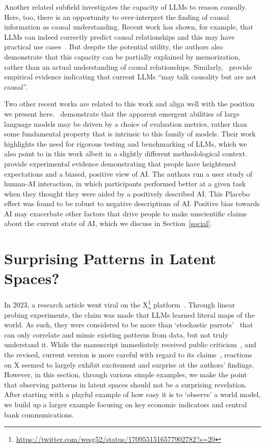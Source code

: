 Another related subfield investigates the capacity of LLMs to reason causally. Here, too, there is an opportunity to over-interpret the finding of causal information as causal understanding. Recent work has shown, for example, that LLMs can indeed correctly predict causal relationships and this may have practical use cases~\citep{kiciman2023causal}. But despite the potential utility, the authors also demonstrate that this capacity can be partially explained by memorization, rather than an actual understanding of causal relationships. Similarly,~\citet{zevcevic2023causal} provide empirical evidence indicating that current LLMs ``may talk causality but are not causal''.

Two other recent works are related to this work and align well with the position we present here.~\citet{schaeffer2024emergent} demonstrate that the apparent emergent abilities of large language models may be driven by a choice of evaluation metrics, rather than some fundamental property that is intrinsic to this family of models. Their work highlights the need for rigorous testing and benchmarking of LLMs, which we also point to in this work albeit in a slightly different methodological context.~\citet{kloft2024ai} provide experimental evidence demonstrating that people have heightened expectations and a biased, positive view of AI. The authors run a user study of human-AI interaction, in which participants performed better at a given task when they thought they were aided by a positively described AI. This Placebo effect was found to be robust to negative descriptions of AI. Positive bias towards AI may exacerbate other factors that drive people to make unscientific claims about the current state of AI, which we discuss in Section~\ref*{social}.

\section{Surprising Patterns in Latent Spaces?}\label{patterns-in-latent-spaces-and-how-to-find-them}

In 2023, a research article went viral on the X\footnote{\url{https://twitter.com/wesg52/status/1709551516577902782?s=20}} platform~\citep{gurnee2023languagev1}. Through linear probing experiments, the claim was made that LLMs learned literal maps of the world. As such, they were considered to be more than `stochastic parrots'~\citep{bender2021dangers} that can only correlate and mimic existing patterns from data, but not truly understand it. While the manuscript immediately received public criticism~\citep{marcus2023muddles}, and the revised, current version is more careful with regard to its claims~\citep{gurnee2023languagev2}, reactions on X seemed to largely exhibit excitement and surprise at the authors' findings. However, in this section, through various simple examples, we make the point that observing patterns in latent spaces should not be a surprising revelation. After starting with a playful example of how easy it is to `observe' a world model, we build up a larger example focusing on key economic indicators and central bank communications.

